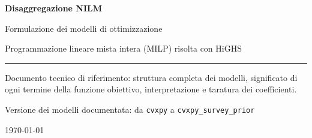\documentclass[11pt,a4paper]{report}
\newcommand{\code}[1]{\texttt{\small #1}}
\begin{document}
\begin{titlepage}
\centering
\vspace*{2.5cm}

{\Huge\bfseries\color{CorpBlue} Disaggregazione NILM\par}
\vspace{0.6cm}
{\LARGE\color{CorpGray} Formulazione dei modelli di ottimizzazione\par}
\vspace{0.3cm}
{\large\color{CorpGray} Programmazione lineare mista intera (MILP) risolta con HiGHS\par}

\vspace{2.2cm}
\rule{0.75\textwidth}{1.2pt}

\vspace{1.2cm}
\begin{minipage}{0.8\textwidth}
\centering\large\color{CorpGray}
Documento tecnico di riferimento: struttura completa dei modelli,
significato di ogni termine della funzione obiettivo,
interpretazione e taratura dei coefficienti.
\end{minipage}

\vfill
{\large\color{CorpGray} Versione dei modelli documentata: da \code{cvxpy} a \code{cvxpy\_survey\_prior}\par}
\vspace{0.4cm}
{\color{CorpGray}\today\par}
\end{titlepage}

\tableofcontents
\cleardoublepage










\end{document}

